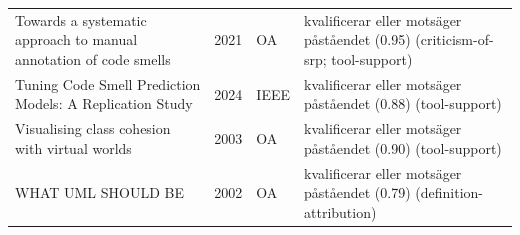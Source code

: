 \begin{longtable}{@{}%
  >{\raggedright\arraybackslash}p{}c%
  >{\raggedright\arraybackslash}p{}%
  >{\raggedright\arraybackslash}p{}@{}}
Towards a systematic approach to manual annotation of code smells & 2021 & OA & kvalificerar eller motsäger påståendet (0.95) (criticism-of-srp; tool-support) \\
Tuning Code Smell Prediction Models: A Replication Study & 2024 & IEEE & kvalificerar eller motsäger påståendet (0.88) (tool-support) \\
Visualising class cohesion with virtual worlds & 2003 & OA & kvalificerar eller motsäger påståendet (0.90) (tool-support) \\
WHAT UML SHOULD BE & 2002 & OA & kvalificerar eller motsäger påståendet (0.79) (definition-attribution) \\
\end{longtable}
\endgroup
